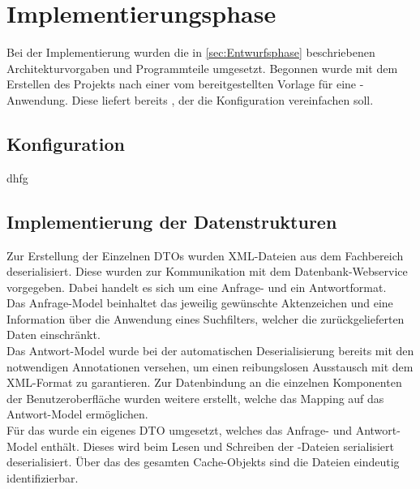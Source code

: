 \section{Implementierungsphase} 
\label{sec:Implementierungsphase}
Bei der Implementierung wurden die in \ref{sec:Entwurfsphase}  beschriebenen Architekturvorgaben
und Programmteile umgesetzt. Begonnen wurde mit dem Erstellen des Projekts nach einer vom 
bereitgestellten Vorlage für eine -Anwendung. Diese liefert bereits ,
der \zB die Konfiguration vereinfachen soll.

\subsection{Konfiguration}
\label{sec:Konfiguration}
dhfg

\subsection{Implementierung der Datenstrukturen}
\label{sec:ImplementierungDatenstrukturen}
Zur Erstellung der Einzelnen \acs{DTO}s wurden XML-Dateien aus dem Fachbereich deserialisiert. Diese wurden zur Kommunikation
mit dem Datenbank-Webservice vorgegeben. Dabei handelt es sich um eine Anfrage- und ein Antwortformat.\\
Das Anfrage-Model beinhaltet das jeweilig gewünschte Aktenzeichen und eine Information über die Anwendung eines Suchfilters,
welcher die zurückgelieferten Daten einschränkt.\\
Das Antwort-Model wurde bei der automatischen Deserialisierung bereits mit den notwendigen Annotationen versehen,
um einen reibungslosen Ausstausch mit dem XML-Format zu garantieren. Zur Datenbindung an die einzelnen Komponenten der
Benutzeroberfläche wurden weitere  erstellt, welche das Mapping auf das Antwort-Model ermöglichen.\\
Für das  wurde ein eigenes \acs{DTO} umgesetzt, welches das Anfrage- und Antwort-Model enthält.
Dieses wird beim Lesen und Schreiben der -Dateien serialisiert \bzw deserialisiert.
Über das  des gesamten Cache-Objekts sind die Dateien eindeutig identifizierbar.

